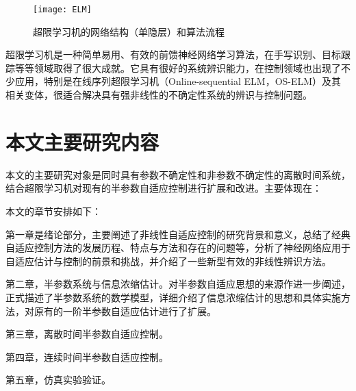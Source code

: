 \begin{figure}
 \centering
 \texttt{[image: ELM]}
 \caption{超限学习机的网络结构（单隐层）和算法流程}\label{fig:elm}
\end{figure}

超限学习机是一种简单易用、有效的前馈神经网络学习算法，在手写识别、目标跟踪等等领域取得了很大成就。它具有很好的系统辨识能力，在控制领域也出现了不少应用，特别是在线序列超限学习机（Online-sequential ELM，OS-ELM）及其相关变体，很适合解决具有强非线性的不确定性系统的辨识与控制问题。

\section{本文主要研究内容}

本文的主要研究对象是同时具有参数不确定性和非参数不确定性的离散时间系统，结合超限学习机对现有的半参数自适应控制进行扩展和改进。主要体现在：

本文的章节安排如下：

第一章是绪论部分，主要阐述了非线性自适应控制的研究背景和意义，总结了经典自适应控制方法的发展历程、特点与方法和存在的问题等，分析了神经网络应用于自适应估计与控制的前景和挑战，并介绍了一些新型有效的非线性辨识方法。

第二章，半参数系统与信息浓缩估计。对半参数自适应思想的来源作进一步阐述，正式描述了半参数系统的数学模型，详细介绍了信息浓缩估计的思想和具体实施方法，对原有的一阶半参数自适应估计进行了扩展。

第三章，离散时间半参数自适应控制。

第四章，连续时间半参数自适应控制。

第五章，仿真实验验证。
